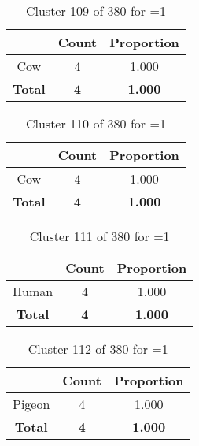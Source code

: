 \begin{table}[ht!]
\centering
\begin{tabular}{|c|c|c|}
\hline
\bf \Spec{} &\bf Count &\bf Proportion\\ \hline \hline
Cow & 4 & 1.000\\ \hline
\hline
\bf Total & \bf 4 & \bf 1.000\\ \hline
\end{tabular}
\label{tab:cluster:109:1}
\caption{Cluster 109 of 380 for \minneigh{}=1}
\end{table}

\clearpage
\begin{table}[ht!]
\centering
\begin{tabular}{|c|c|c|}
\hline
\bf \Spec{} &\bf Count &\bf Proportion\\ \hline \hline
Cow & 4 & 1.000\\ \hline
\hline
\bf Total & \bf 4 & \bf 1.000\\ \hline
\end{tabular}
\label{tab:cluster:110:1}
\caption{Cluster 110 of 380 for \minneigh{}=1}
\end{table}

\begin{table}[ht!]
\centering
\begin{tabular}{|c|c|c|}
\hline
\bf \Spec{} &\bf Count &\bf Proportion\\ \hline \hline
Human & 4 & 1.000\\ \hline
\hline
\bf Total & \bf 4 & \bf 1.000\\ \hline
\end{tabular}
\label{tab:cluster:111:1}
\caption{Cluster 111 of 380 for \minneigh{}=1}
\end{table}

\begin{table}[ht!]
\centering
\begin{tabular}{|c|c|c|}
\hline
\bf \Spec{} &\bf Count &\bf Proportion\\ \hline \hline
Pigeon & 4 & 1.000\\ \hline
\hline
\bf Total & \bf 4 & \bf 1.000\\ \hline
\end{tabular}
\label{tab:cluster:112:1}
\caption{Cluster 112 of 380 for \minneigh{}=1}
\end{table}

